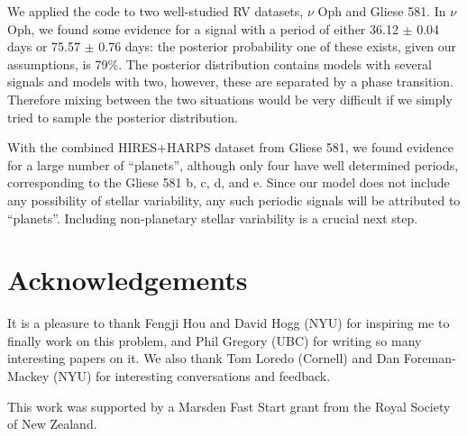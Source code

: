 \documentclass[useAMS,usenatbib]{mn2e}
\begin{document}
We applied the code to two well-studied RV datasets, $\nu$ Oph and Gliese 581.
In $\nu$ Oph, we found some evidence for a signal with a period of
either 36.12 $\pm$ 0.04 days or
75.57 $\pm$ 0.76 days: the posterior probability one of these exists, given our
assumptions, is 79\%. The posterior distribution contains models with several
signals and models with two, however, these are separated by a phase transition.
Therefore mixing between the two situations would be very difficult if we simply tried to sample the posterior distribution.

With the combined HIRES+HARPS dataset from Gliese 581, we found
evidence for a large number of ``planets'', although only four have well
determined periods, corresponding to the Gliese 581 b, c, d,
and e. Since our model does not include any possibility of stellar variability,
any such periodic signals will be attributed to ``planets''.
Including non-planetary stellar variability is a crucial next step.

\vspace{-0.5cm}
\section*{Acknowledgements}
It is a pleasure to thank Fengji Hou and David Hogg (NYU) for inspiring me to
finally work on this problem, and Phil Gregory (UBC) for writing so many
interesting papers on it. We also thank Tom Loredo (Cornell) and Dan
Foreman-Mackey (NYU) for interesting conversations and feedback.

This work was supported by a Marsden Fast Start
grant from the Royal Society of
New Zealand.
\end{document}
